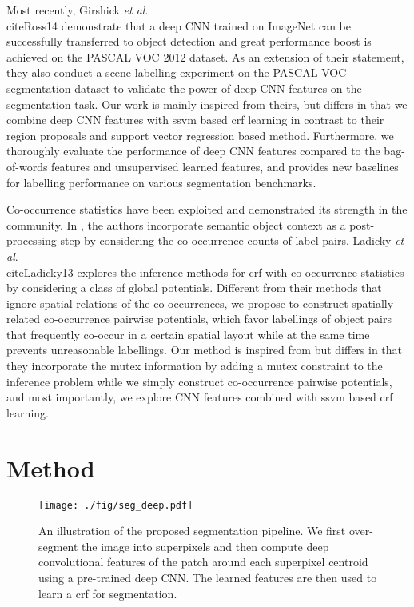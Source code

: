 \documentclass[10pt,3p]{elsarticle}
\def\onedot{.\xspace}
\def\etal{\emph{et al}\onedot}
\newcommand{\ssvm}{{\sc ssvm}\xspace}
\newcommand{\crf}{{\sc crf}\xspace}
\begin{document}
Most recently, Girshick \etal \\cite{Ross14} demonstrate that a deep CNN trained on ImageNet can be successfully transferred to object detection and great performance boost is achieved on the PASCAL VOC 2012 dataset. As an extension of their statement, they also conduct a scene labelling experiment on the PASCAL VOC segmentation dataset to validate the power of deep CNN features on the segmentation task.
Our work is mainly inspired from theirs, but differs in that we combine deep CNN features with \ssvm based \crf learning in contrast to their region proposals and support vector regression based method.  Furthermore, we thoroughly evaluate the performance of deep CNN features compared to the bag-of-words features and unsupervised learned features, and provides new baselines for labelling performance on various segmentation benchmarks.

Co-occurrence statistics have been exploited and demonstrated its strength in the community. In \cite{Rabinovich07}, the authors incorporate semantic object context as a post-processing step by considering the co-occurrence counts of label pairs.
Ladicky \etal \\cite{Ladicky13} explores the inference methods for \crf with co-occurrence statistics by considering a class of global potentials.
Different from their methods that ignore spatial relations of the co-occurrences, we propose to construct spatially related co-occurrence pairwise potentials, which favor labellings of object pairs that frequently co-occur in a certain spatial layout while at the same time prevents unreasonable labellings.
Our method is  inspired from \cite{Roy14} but differs in that they incorporate the mutex information by adding a mutex constraint to the inference problem while we simply construct co-occurrence pairwise potentials, and most importantly, we explore CNN features combined with \ssvm based \crf learning.


\section{Method}
\begin{figure}[!t]
\centering
    \texttt{[image: ./fig/seg\_deep.pdf]}\\
\caption{An illustration of the proposed segmentation pipeline.
We first over-segment the image into superpixels and then compute deep convolutional features of the patch around each superpixel centroid using a pre-trained deep CNN. The learned features are then used to learn a \crf for segmentation.  }
\label{fig:illu_seg}
\end{figure}
\end{document}
